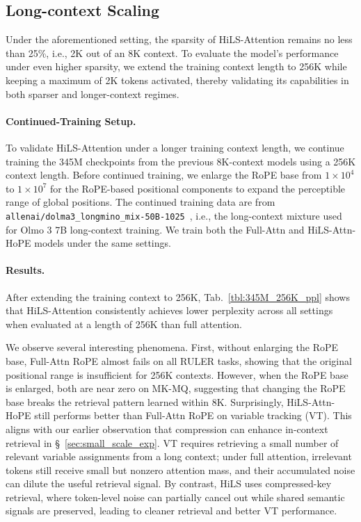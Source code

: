 \subsection{Long-context Scaling}
Under the aforementioned setting, the sparsity of HiLS-Attention remains no less than 25\%, i.e., 2K out of an 8K context.
To evaluate the model's performance under even higher sparsity, we extend the training context length to 256K while keeping a maximum of 2K tokens activated, thereby validating its capabilities in both sparser and longer-context regimes.

\paragraph{Continued-Training Setup.} 
To validate HiLS-Attention under a longer training context length, we continue training the 345M checkpoints from the previous 8K-context models using a 256K context length.
Before continued training, we enlarge the RoPE base from $1\times 10^4$ to $1\times 10^7$ for the RoPE-based positional components to expand the perceptible range of global positions. The continued training data are from \texttt{allenai/dolma3\_longmino\_mix-50B-1025}~\citep{allenai_dolma3_longmino_mix_50b_1025}, i.e., the long-context mixture used for Olmo 3 7B long-context training. 
We train both the Full-Attn and HiLS-Attn-HoPE models under the same settings.



\paragraph{Results.}
After extending the training context to 256K, Tab.~\ref{tbl:345M_256K_ppl} shows that HiLS-Attention consistently achieves lower perplexity across all settings when evaluated at a length of 256K than full attention.

We observe several interesting phenomena. First, without enlarging the RoPE base, Full-Attn RoPE almost fails on all RULER tasks, showing that the original positional range is insufficient for 256K contexts. However, when the RoPE base is enlarged, both are near zero on MK-MQ, suggesting that changing the RoPE base breaks the retrieval pattern learned within 8K.
Surprisingly, HiLS-Attn-HoPE still performs better than Full-Attn RoPE on variable tracking (VT). 
This aligns with our earlier observation that compression can enhance in-context retrieval in \S~\ref{sec:small_scale_exp}. 
VT requires retrieving a small number of relevant variable assignments from a long context; under full attention, irrelevant tokens still receive small but nonzero attention mass, and their accumulated noise can dilute the useful retrieval signal. 
By contrast, HiLS uses compressed-key retrieval, where token-level noise can partially cancel out while shared semantic signals are preserved, leading to cleaner retrieval and better VT performance.

